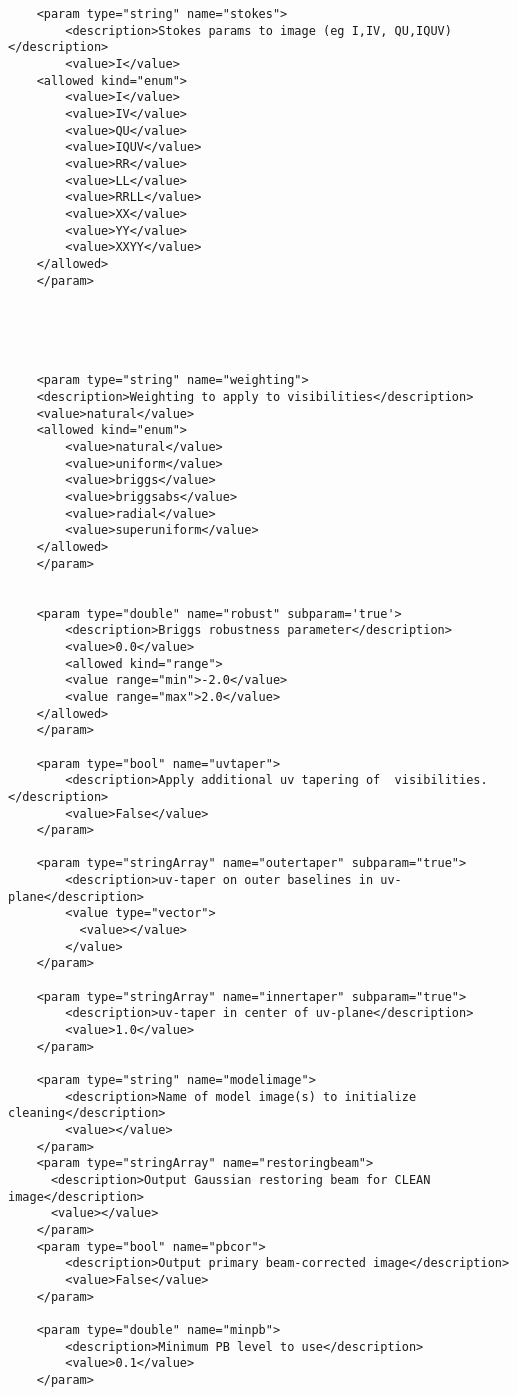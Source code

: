 \begin{verbatim}
    <param type="string" name="stokes">
	    <description>Stokes params to image (eg I,IV, QU,IQUV)</description>
	    <value>I</value>
    <allowed kind="enum">
	    <value>I</value>
	    <value>IV</value>
	    <value>QU</value>
	    <value>IQUV</value>
	    <value>RR</value>
	    <value>LL</value>
	    <value>RRLL</value>
	    <value>XX</value>
	    <value>YY</value>
	    <value>XXYY</value>
    </allowed>
    </param>

    

    

    <param type="string" name="weighting">
    <description>Weighting to apply to visibilities</description>
    <value>natural</value>
    <allowed kind="enum">
	    <value>natural</value>
	    <value>uniform</value>
	    <value>briggs</value>
	    <value>briggsabs</value>
	    <value>radial</value>
	    <value>superuniform</value>
    </allowed>
    </param>


    <param type="double" name="robust" subparam='true'>
	    <description>Briggs robustness parameter</description>
	    <value>0.0</value>
	    <allowed kind="range">
	    <value range="min">-2.0</value>
	    <value range="max">2.0</value>
    </allowed>
    </param>

    <param type="bool" name="uvtaper">
	    <description>Apply additional uv tapering of  visibilities.</description>
	    <value>False</value>
    </param>

    <param type="stringArray" name="outertaper" subparam="true">
	    <description>uv-taper on outer baselines in uv-plane</description>
	    <value type="vector">
	      <value></value>
	    </value>
    </param>

    <param type="stringArray" name="innertaper" subparam="true">
	    <description>uv-taper in center of uv-plane</description>
	    <value>1.0</value>
    </param>

    <param type="string" name="modelimage">
	    <description>Name of model image(s) to initialize cleaning</description>
	    <value></value>
    </param>
    <param type="stringArray" name="restoringbeam">
      <description>Output Gaussian restoring beam for CLEAN image</description>
      <value></value>
    </param>
    <param type="bool" name="pbcor">
	    <description>Output primary beam-corrected image</description>
	    <value>False</value>
    </param>

    <param type="double" name="minpb">
	    <description>Minimum PB level to use</description>
	    <value>0.1</value>
    </param>



\end{verbatim}
